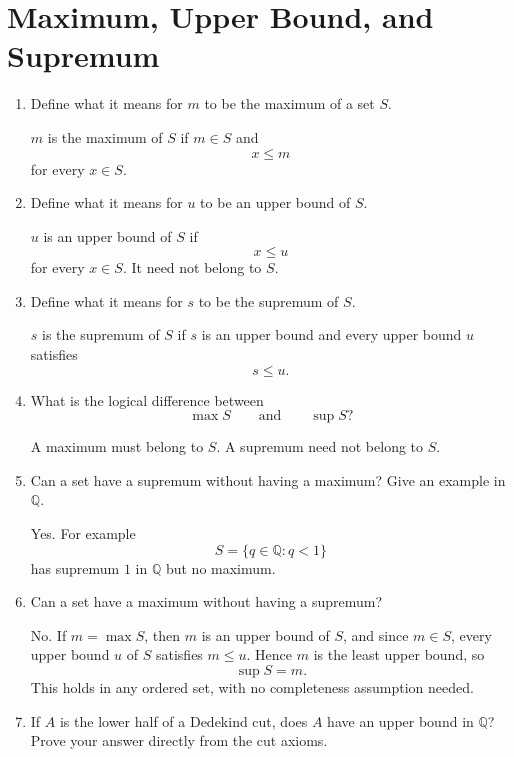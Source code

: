 \documentclass{self-check}
\begin{document}
\section{Maximum, Upper Bound, and Supremum}

\begin{enumerate}[label=\arabic{*}., itemsep=10pt]
  \item Define what it means for \(m\) to be the maximum of a set \(S\).

    \begin{answer}
      \(m\) is the maximum of \(S\) if \(m\in S\) and
      \[ x\le m \]
      for every \(x\in S\).
    \end{answer}
  \item Define what it means for \(u\) to be an upper bound of \(S\).

    \begin{answer}
      \(u\) is an upper bound of \(S\) if
      \[ x\le u \]
      for every \(x\in S\). It need not belong to \(S\).
    \end{answer}
  \item Define what it means for \(s\) to be the supremum of \(S\).

    \begin{answer}
      \(s\) is the supremum of \(S\) if \(s\) is an upper bound and every upper bound \(u\) satisfies
      \[ s\le u. \]
    \end{answer}
  \item What is the logical difference between
    \[ \max S \qquad\text{and}\qquad \sup S? \]

    \begin{answer}
      A maximum must belong to \(S\). A supremum need not belong to \(S\).
    \end{answer}
  \item Can a set have a supremum without having a maximum? Give an example in \(\mathbb{Q}\).

    \begin{answer}
      Yes. For example
      \[ S=\{q\in\mathbb{Q}:q<1\} \]
      has supremum \(1\) in \(\mathbb{Q}\) but no maximum.
    \end{answer}
  \item Can a set have a maximum without having a supremum?

    \begin{answer}
      No. If \(m=\max S\), then \(m\) is an upper bound of \(S\), and since \(m\in S\), every upper bound \(u\) of \(S\) satisfies \(m\le u\). Hence \(m\) is the least upper bound, so
      \[ \sup S=m. \]
      This holds in any ordered set, with no completeness assumption needed.
    \end{answer}
  \item If \(A\) is the lower half of a Dedekind cut, does \(A\) have an upper bound in \(\mathbb{Q}\)? Prove your answer directly from the cut axioms.


\end{enumerate}
\end{document}
